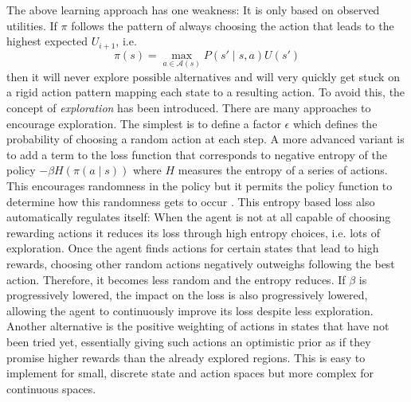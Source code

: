 The above learning approach has one weakness: It is only based on observed utilities. If $\pi$ follows the pattern of
always choosing the action that leads to the highest expected $U_{i+1}$, i.e.
\begin{equation}
    \pi(s) = \max_{a \in \mathcal{A}(s)}P(s' \mid s, a)U(s')
\end{equation}
then it will never explore possible alternatives and will very quickly get stuck on a rigid action
pattern mapping each state to a resulting action. To avoid this, the concept of \emph{exploration} has been introduced.
There are many approaches to encourage exploration. The simplest is to define a factor $\epsilon$ which defines the
probability of choosing a random action at each step.
A more advanced variant is to add a term to the loss function that
corresponds to negative entropy of the policy $-\beta H(\pi(a \mid s ))$ where $H$ measures the entropy of a series of
actions. This encourages randomness in the policy but it permits the policy function to determine how this randomness
gets to occur \citep{schmitt2018kickstarting}. This entropy based loss also automatically regulates itself: When the
agent is not at all capable of choosing rewarding actions it reduces its loss through high entropy choices, i.e. lots of
exploration. Once the agent finds actions for certain states that lead to high rewards, choosing other random actions
negatively outweighs following the best action. Therefore, it becomes less random and the entropy reduces. If $\beta$ is
progressively lowered, the impact on the loss is also progressively lowered, allowing the agent to continuously improve
its loss despite less exploration.
Another alternative is the positive weighting of actions in states that have not been tried yet, essentially giving such
actions an optimistic prior as if they promise higher rewards than the already explored regions. This is easy to
implement for small, discrete state and action spaces but more complex for continuous spaces.



